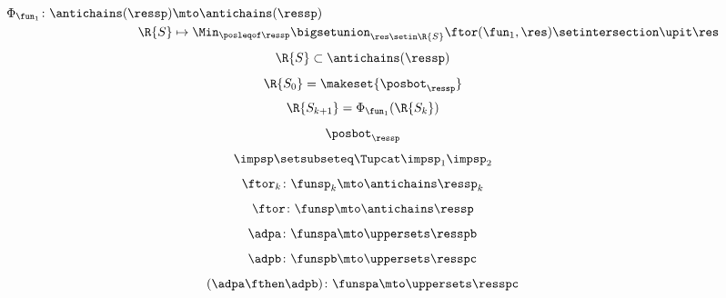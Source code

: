 {\begin{forslides}
\begin{equation}
\begin{aligned}
                \Phi_{\fun_1}\colon \antichains(\ressp) & \mto \antichains(\ressp) \\
                \R{S}                                   & \mapsto \Min_{\posleqof\ressp} \bigsetunion_{\res \setin \R{S}}\ftor(\fun_1,\res)\setintersection \upit \res
            \end{aligned}
        \end{equation}
        \begin{equation}
            \label{eq:genfun_11}
            \R{S}\subset \antichains(\ressp)
        \end{equation}
        \begin{equation}
            \label{eq:genfun_12}
            \R{S_0}=\makeset{ \posbot_\ressp}
        \end{equation}
        \begin{equation}
            \label{eq:genfun_13}
            \R{S_{k+1}}=\Phi_{\fun_1}(\R{S_k})
        \end{equation}
        \begin{equation}
            \label{eq:genfun_14}
            \posbot_{\ressp}
        \end{equation}
        \begin{equation}
            \label{eq:imp_comp}
            \impsp \setsubseteq \Tupcat \impsp_{1}  \impsp_{2}
        \end{equation}
        \begin{equation}
            \label{eq:dp_mob_4}
            \ftor_k\colon \funsp_k \mto \antichains \ressp_k
        \end{equation}
        \begin{equation}
            \label{eq:dp_mob_5}
            \ftor\colon \funsp \mto \antichains \ressp
        \end{equation}
        \begin{equation}
            \label{eq:dp_mob_6}
            \adpa\colon \funspa \mto \uppersets \resspb
        \end{equation}
        \begin{equation}
            \label{eq:dp_mob_7}
            \adpb\colon \funspb \mto \uppersets \resspc
        \end{equation}
        \begin{equation}
            \label{eq:dp_mob_8}
            (\adpa \fthen \adpb) \colon \funspa \mto \uppersets \resspc
        \end{equation}
    \end{forslides}
}

